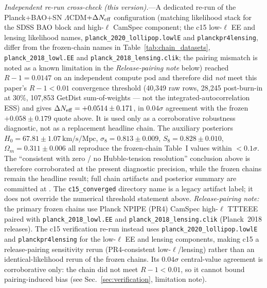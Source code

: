 \documentclass[aps,prd,twocolumn,superscriptaddress,showpacs,preprintnumbers,nofootinbib,longbibliography,floatfix]{revtex4-2}
\newcommand{\Neff}{N_{\rm eff}}
\begin{document}
\textit{Independent re-run cross-check (this version).}---A dedicated
re-run of the Planck+BAO+SN $\Lambda$CDM$+\Delta\Neff$ configuration
(matching likelihood stack for the SDSS BAO block and high-$\ell$ CamSpec component; the c15 low-$\ell$ EE and lensing likelihood names, \texttt{planck\_2020\_lollipop.lowlE} and \texttt{planckpr4lensing}, differ from the frozen-chain names in Table~\ref{tab:chain_datasets}, \texttt{planck\_2018\_lowl.EE} and \texttt{planck\_2018\_lensing.clik}; the pairing mismatch is noted as a known limitation in the \emph{Release-pairing note} below) reached
$R\!-\!1\!=\!0.0147$ on an independent compute pod and therefore did
\emph{not} meet this paper's $R\!-\!1<0.01$ convergence threshold
(40,349 raw rows, 28,245 post-burn-in at 30\%, 107,853 GetDist sum-of-weights --- not the integrated-autocorrelation ESS)
and gives $\Delta N_{\rm eff} = +0.0514 \pm 0.171$, in $0.04\sigma$
agreement with the frozen $+0.058 \pm 0.179$ quote above. It is used only as
a corroborative robustness diagnostic, not as a replacement headline chain.
The auxiliary
posteriors $H_0 = 67.81 \pm 1.07~\mathrm{km/s/Mpc}$,
$\sigma_8 = 0.813 \pm 0.009$, $S_8 = 0.828 \pm 0.010$,
$\Omega_m = 0.311 \pm 0.006$ all reproduce the frozen-chain Table~I
values within $<\!0.1\sigma$. The ``consistent with zero / no
Hubble-tension resolution'' conclusion above is therefore corroborated at
the present diagnostic precision, while the frozen chains remain the
headline result; full chain artifacts and posterior summary
are committed at
\href{https://github.com/Hubify-Projects/bigbounce/tree/main/reproducibility/cosmology/chains/w0wa_quintom_desi_dr2/c15_converged/}{}.
The \texttt{c15\_converged} directory name is a legacy artifact label; it
does not override the numerical threshold statement above.
\emph{Release-pairing note:} the primary frozen chains use Planck NPIPE (PR4) CamSpec high-$\ell$ TTTEEE
paired with \texttt{planck\_2018\_lowl.EE} and \texttt{planck\_2018\_lensing.clik} (Planck~2018 releases).
The c15 verification re-run instead uses \texttt{planck\_2020\_lollipop.lowlE} and
\texttt{planckpr4lensing} for the low-$\ell$ EE and lensing components, making c15 a
release-pairing sensitivity rerun (PR4-consistent low-$\ell$/lensing) rather than an
identical-likelihood rerun of the frozen chains. Its $0.04\sigma$ central-value
agreement is corroborative only: the chain did not meet $R-1<0.01$, so it cannot
bound pairing-induced bias (see Sec.~\ref{sec:verification}, limitation note).
\end{document}
